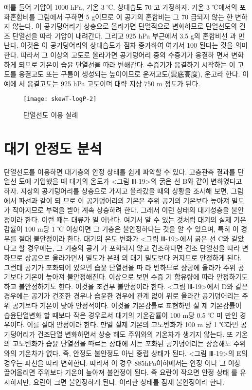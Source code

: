 예를 들어 기압이 1000 hPa, 기온 3 ℃, 상대습도 70%
고 가정하자. 기온 3 ℃에서의 포화혼합비를 그림에서 구하면 5 g이므로 이 공기의 혼합비는
그 70%
급되지 않는 한 변하지 않는다. 이 공기덩어리가 상층으로 올라가면 단열적으로 변화하므로
단열선도의 건조 단열선을 따라 기압이 내려간다. 그리고 925 hPa 부근에서 3.5 g의 혼합비선
과 만난다. 이것은 이 공기덩어리의 상대습도가 점차 증가하여 여기서 100%
된다는 것을 의미한다. 따라서 그 이상의 고도로 올라가면 공기덩어리 중의 수증기가 응결하
면서 변화하게 되므로 기온이 습윤 단열선을 따라 변해간다. 수증기가 응결하기 시작하는 이
고도를 응결고도 또는 구름이 생성되는 높이이므로 운저고도(雲底高度), 운고라 한다. 이 예에
서 응결고도는 925 hPa 고도이며 대략 지상 750 m 정도가 된다.

\begin{figure}[h]
	\centering
	\texttt{[image: skewT-logP-2]}
	\caption{단열선도 이용 실례}
	\label{fig:skewt-logp-1}
\end{figure}


\section{대기 안정도 분석}

단열선도를 이용하면 대기층의 안정 상태를 쉽게 파악할 수 있다. 고층관측 결과를 단열선
도에 기입했을 때 대기의 온도가 <그림 Ⅲ-19>의 굵은 선 B와 같이 변하였다고 하자. 지상의
공기덩어리를 상층으로 가지고 올라갔을 때의 상황을 조사해 보면, 그림에서 파선과 같이 되
므로 이 공기덩어리의 기온은 주위 공기의 기온보다 높아져 밀도가 작아지므로 부력을 받아
계속 상승하려 한다. 그래서 이런 상태의 대기성층을 불안정이라 한다. 이런 때는 대류가 일
어난다. 여기서 알 수 있는 것처럼 대기의 실제 기온감률이 100 m당 1 ℃ 이상이면 그 기층은
불안정하다는 것을 알 수 있으며, 특히 이 경우를 절대 불안정이라 한다.
대기의 온도 변화가 <그림 Ⅲ-19>에서 굵은 선 C와 같았다고 할 경우에는, 그 기층의 공기
가 포화되지 않고 건조하다면 건조 단열선을 따라 변하므로 상공으로 올라가면서 밀도가 본래
의 대기 밀도보다 커지므로 안정하게 된다. 그런데 공기가 포화되어 있으면 습윤 단열선을 따
라 변하므로 상공에 올라가 주위 공기보다 기온이 높아져 불안정해진다. 이상으로 보면 수증
기 함유량에 따라 안정하기도 하고 불안정하기도 한다. 이것을 조건부 불안정이라 한다.
<그림 Ⅲ-19>에서 D와 같은 경우에는 공기가 건조한 경우나 습윤한 경우에 관계 없이 위로
올라간 공기덩어리는 주위 공기보다 기온이 낮아 안정적이다. 이것을 기온감률로 표현하면 실
제 기온감률이 습윤단열변화 할 때보다 작은 경우로서 대기의 기온감률이 100 m당 0.5 ℃ 미
만인 경우이다. 이를 절대 안정이라 한다.
만일 실제 기온의 고도변화가 100 m 당 1 ℃라면 공기덩어리가 건조단열 변화하면서 상승
해도 주위와의 기온차가 생기지 않는다. 또 기온의 고도변화가 습윤 단열선을 따르는 상태에
서는 포화된 공기덩어리는 상승해도 주위와의 기온차가 없다. 즉, 안정도 불안정도 아닌 중립
상태가 된다.
<그림 Ⅲ-19>의 E의 경우는 파선을 따라 변화한다. 따라서 이 경우 885hPa이하에서는 안정
이나 그 이상 끌어올리면 주위보다 기온이 높아져 불안정이 된다. 즉 요란이 작으면 안정 상태
를 유지하지만, 요란이 크면 불안정하게 된다. 이러한 상태를 잠재 불안정이라 한다.


